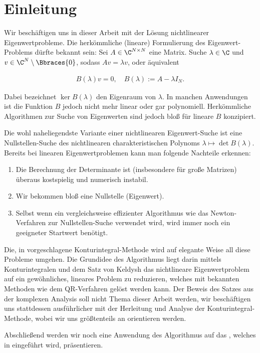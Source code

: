 \chapter{Einleitung}
Wir beschäftigen uns in dieser Arbeit mit der Lösung nichtlinearer Eigenwertprobleme.
Die herkömmliche (lineare) Formulierung des Eigenwert-Problems dürfte bekannt sein:
Sei $A \in \C^{N \times N}$ eine Matrix.
Suche $\lambda \in \C$ und $v \in \C^N \setminus \Bbraces{0}$, sodass $A v = \lambda v$, oder
äquivalent

\begin{align} \label{eq:lineares_ewp}
    B(\lambda) v = 0,
    \quad
    B(\lambda) := A - \lambda I_N.
\end{align}

Dabei bezeichnet $\ker B(\lambda)$ den Eigenraum von $\lambda$.
In manchen Anwendungen ist die Funktion $B$ jedoch nicht mehr linear oder gar polynomiell.
Herkömmliche Algorithmen zur Suche von Eigenwerten sind jedoch bloß für lineare $B$ konzipiert.

Die wohl naheliegendste Variante einer nichtlinearen Eigenwert-Suche ist eine Nullstellen-Suche
des nichtlinearen charakteristischen Polynoms $\lambda \mapsto \det B(\lambda)$.
Bereits bei linearen Eigenwertproblemen kann man folgende Nachteile erkennen:

\begin{enumerate}[label = \arabic*.]
    \item Die Berechnung der Determinante ist (insbesondere für große Matrizen) überaus kostspielig
    und numerisch instabil.
    \item Wir bekommen bloß eine Nullstelle (Eigenwert).
    \item Selbst wenn ein vergleichsweise effizienter Algorithmus wie das Newton-Verfahren zur Nullstellen-Suche verwendet wird, wird immer noch ein geeigneter Startwert benötigt.
\end{enumerate}

Die, in \cite{BEYN20123839} vorgeschlagene Konturintegral-Methode wird auf elegante Weise all diese Probleme umgehen.
Die Grundidee des Algorithmus liegt darin mittels Konturintegralen und dem
Satz von Keldysh das nichtlineare Eigenwertproblem auf ein gewöhnliches,
lineares Problem zu reduzieren, welches mit bekannten Methoden wie dem QR-Verfahren
gelöst werden kann.
Der Beweis des Satzes aus der komplexen Analysis soll nicht Thema dieser Arbeit werden, wir beschäftigen uns
stattdessen ausführlicher mit der Herleitung und Analyse der Konturintegral-Methode, wobei wir uns größtenteils an \cite{EWPs} orientieren werden.

Abschließend werden wir noch eine Anwendung des Algorithmus
auf das , welches in \cite{saad2020rational} eingeführt wird, präsentieren.
